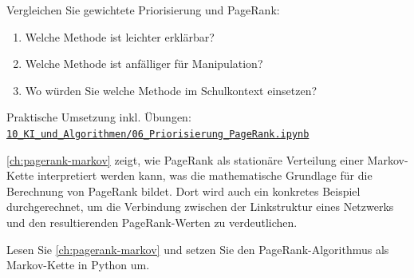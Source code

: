 \begin{mychallenge}
    Vergleichen Sie gewichtete Priorisierung und PageRank:
    \begin{enumerate}
        \item Welche Methode ist leichter erklärbar?
        \item Welche Methode ist anfälliger für Manipulation?
        \item Wo würden Sie welche Methode im Schulkontext einsetzen?
    \end{enumerate}
\end{mychallenge}

\begin{myremark}[Notebook]
    Praktische Umsetzung inkl. Übungen:
    \href{\notebookurl}{\texttt{10\_KI\_und\_Algorithmen/06\_Priorisierung\_PageRank.ipynb}}
\end{myremark}

\cref{ch:pagerank-markov} zeigt, wie PageRank als stationäre Verteilung einer Markov-Kette interpretiert werden kann, was die mathematische Grundlage für die Berechnung von PageRank bildet. Dort wird auch ein konkretes Beispiel durchgerechnet, um die Verbindung zwischen der Linkstruktur eines Netzwerks und den resultierenden PageRank-Werten zu verdeutlichen.

\begin{mychallenge}
Lesen Sie \cref{ch:pagerank-markov} und setzen Sie den PageRank-Algorithmus als Markov-Kette in Python um.
\end{mychallenge}
